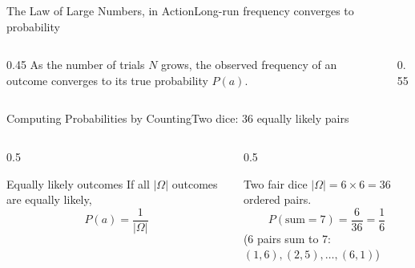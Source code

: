 \documentclass[aspectratio=169,11pt]{beamer}
\begin{document}
\begin{frame}{The Law of Large Numbers, in Action}{Long-run frequency converges to probability}
  \begin{columns}[T]
    \begin{column}{0.45\textwidth}
      \small As the number of trials $N$ grows, the observed frequency of an
      outcome converges to its true probability $P(a)$.
    \end{column}
    \begin{column}{0.55\textwidth}
      \centering
    \end{column}
  \end{columns}
\end{frame}

\begin{frame}{Computing Probabilities by Counting}{Two dice: 36 equally likely pairs}
  \begin{columns}[T]
    \begin{column}{0.5\textwidth}
      \begin{block}{Equally likely outcomes}
        \small If all $|\Omega|$ outcomes are equally likely,
        \[ P(a) = \frac{1}{|\Omega|} \]
      \end{block}
    \end{column}
    \begin{column}{0.5\textwidth}
      \begin{exampleblock}{Two fair dice}
        \small $|\Omega| = 6\times6 = 36$ ordered pairs.
        \[ P(\text{sum}=7) = \frac{6}{36} = \frac{1}{6} \]
        \small (6 pairs sum to 7: $(1,6),(2,5),\dots,(6,1)$)
      \end{exampleblock}
    \end{column}
  \end{columns}
\end{frame}

\end{document}
